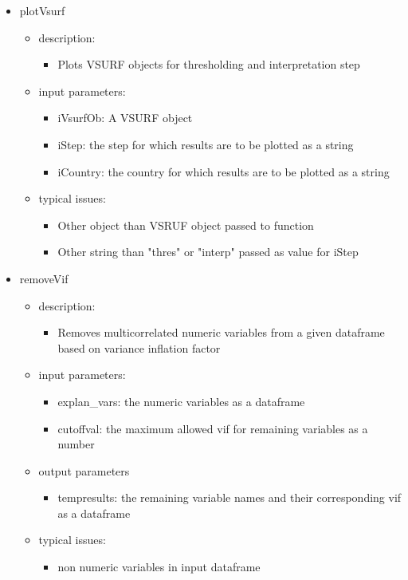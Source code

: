 \documentclass[11pt]{article}
\begin{document}
\begin{itemize}
\item plotVsurf
	\begin{itemize}
	\item description: 
		\begin{itemize}
		\item Plots VSURF objects for thresholding and interpretation step
		\end{itemize}
	\item input parameters: 
		\begin{itemize}
		\item iVsurfOb: A VSURF object
		\item iStep: the step for which results are to be plotted as a string 
		\item iCountry: the country for which results are to be plotted as a string  
		\end{itemize}
	\item typical issues:
		\begin{itemize}
		\item Other object than VSRUF object passed to function
		\item Other string than "thres" or "interp" passed as value for iStep
		\end{itemize}
	\end{itemize}

\item removeVif
	\begin{itemize}
	\item description: 
		\begin{itemize}
		\item Removes multicorrelated numeric variables from a given dataframe based on variance inflation factor
		\end{itemize}
	\item input parameters: 
		\begin{itemize}
		\item explan\_vars: the numeric variables as a dataframe
		\item cutoffval: the maximum allowed vif for remaining variables as a number
		\end{itemize}
	\item output parameters
		\begin{itemize}
		\item tempresults: the remaining variable names and their corresponding vif as a dataframe
		\end{itemize}
	\item typical issues:
		\begin{itemize}
		\item non numeric variables in input dataframe
		\end{itemize}
	\end{itemize}


\end{itemize}
\end{document}
